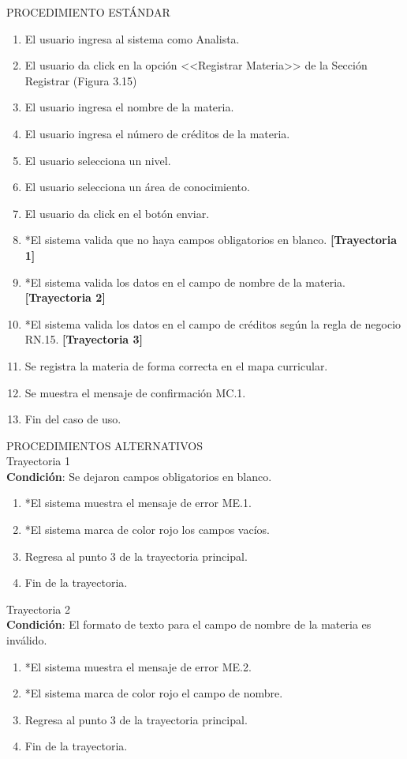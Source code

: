 \newpage
\noindent
\Large{PROCEDIMIENTO ESTÁNDAR}
\large{}
\begin{enumerate}
    \item El usuario ingresa al sistema como Analista.
    \item El usuario da click en la opción <<Registrar Materia>> de la Sección Registrar (Figura 3.15)
    \item El usuario ingresa el nombre de la materia.
    \item El usuario ingresa el número de créditos de la materia.
    \item El usuario selecciona un nivel.
    \item El usuario selecciona un área de conocimiento.
    \item El usuario da click en el botón enviar.
    \item *El sistema valida que no haya campos obligatorios en blanco. \textbf{[Trayectoria 1]}
    \item *El sistema valida los datos en el campo de nombre de la materia. \textbf{[Trayectoria 2]}
    \item *El sistema valida los datos en el campo de créditos según la regla de negocio RN.15. \textbf{[Trayectoria 3]}
    \item Se registra la materia de forma correcta en el mapa curricular.
    \item Se muestra el mensaje de confirmación MC.1.
    \item Fin del caso de uso.
\end{enumerate}
\vspace*{1cm}
\Large{PROCEDIMIENTOS ALTERNATIVOS}\\
\large{Trayectoria 1}\\
\textbf{Condición}: Se dejaron campos obligatorios en blanco.
\begin{enumerate}
    \item *El sistema muestra el mensaje de error ME.1.
    \item *El sistema marca de color rojo los campos vacíos.
    \item Regresa al punto 3 de la trayectoria principal.
    \item Fin de la trayectoria.
\end{enumerate}
\large{Trayectoria 2}\\
\textbf{Condición}: El formato de texto para el campo de nombre de la materia es inválido.
\begin{enumerate}
    \item *El sistema muestra el mensaje de error ME.2.
    \item *El sistema marca de color rojo el campo de nombre.
    \item Regresa al punto 3 de la trayectoria principal.
    \item Fin de la trayectoria.
\end{enumerate}
